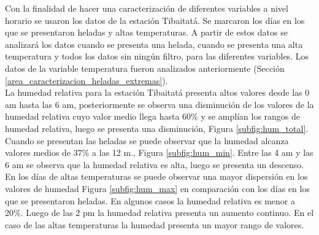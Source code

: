 %	

Con la finalidad de hacer una caracterización de diferentes variables a nivel horario se usaron los datos de la estación Tibaitatá. Se marcaron los días en los que se presentaron heladas y altas temperaturas. A partir de estos datos se analizará los datos cuando se presenta una helada, cuando se presenta una alta temperatura y todos los datos sin ningún filtro, para las diferentes variables. Los datos de la variable temperatura fueron analizados anteriormente (Sección \ref{area_caracterizacion_heladas_extremas}).\\

La humedad relativa para la estación Tibaitatá presenta altos valores desde las 0 am hasta las 6 am, posteriormente se observa una disminución de los valores de la humedad relativa cuyo valor medio llega hasta 60\% y se amplían los rangos de humedad relativa, luego se presenta una disminución, Figura \ref{subfig:hum_total}.\\

Cuando se presentan las heladas se puede observar que la humedad alcanza valores medios de 37\% a las 12 m., Figura \ref{subfig:hum_min}. Entre las 4 am y las 6 am se observa que la humedad relativa es alta, luego se presenta un descenso.\\

En los días de altas temperaturas se puede observar una mayor dispersión en los valores de humedad Figura \ref{subfig:hum_max} en comparación con los días en los que se presentaron heladas. En algunos casos la humedad relativa es menor a 20\%. Luego de las 2 pm la humedad relativa presenta un aumento continuo. En el caso de las altas temperaturas la humedad presenta un mayor rango de valores.\\


